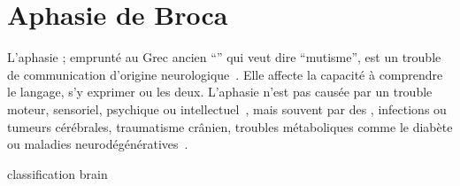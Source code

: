 \chapter{Aphasie de Broca}
\newcommand{\greekaphasia}{\textalpha\textphi\textalpha\textsigma\textiota\textalpha }

L'aphasie ; emprunté au Grec ancien ``\greekaphasia'' qui veut dire ``mutisme'',
est un trouble de communication d'origine neurologique~\cite{Larousse}. 
Elle affecte la capacité à comprendre le langage, s'y exprimer ou les deux.
L'aphasie n'est pas causée par un trouble moteur, sensoriel, psychique ou intellectuel~\cite{Chapey_2008},
mais souvent par des , infections ou tumeurs cérébrales, traumatisme crânien, 
troubles métaboliques comme le diabète ou maladies neurodégénératives~\cite{Hallowell_2017}.


{classification}
{brain}